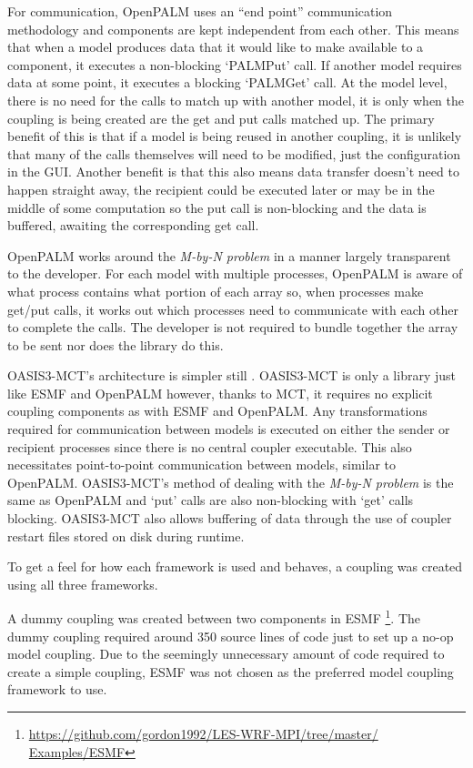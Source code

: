 \documentclass{acm_proc_article-sp}
\renewcommand{\_}{\underscore\hspace{0pt}}
\begin{document}
For communication, OpenPALM uses an ``end point'' communication methodology
\cite{CERFACS2007} and components are kept independent from each other. This
means that when a model produces data that it would like to make available to a
component, it executes a non-blocking `PALM\_Put' call. If another model
requires data at some point, it executes a blocking `PALM\_Get' call. At the
model level, there is no need for the calls to match up with another model, it
is only when the coupling is being created are the get and put calls matched up.
The primary benefit of this is that if a model is being reused in another
coupling, it is unlikely that many of the calls themselves will need to be
modified, just the configuration in the GUI. Another benefit is that this also
means data transfer doesn't need to happen straight away, the recipient could be
executed later or may be in the middle of some computation so the put call is
non-blocking and the data is buffered, awaiting the corresponding get call.

OpenPALM works around the \textit{M-by-N problem} in a manner largely
transparent to the developer. For each model with multiple processes, OpenPALM
is aware of what process contains what portion of each array so, when processes
make get/put calls, it works out which processes need to communicate with each
other to complete the calls. The developer is not required to bundle together
the array to be sent nor does the library do this.

OASIS3-MCT's architecture is simpler still \cite{OASIS3-MCT2013}. OASIS3-MCT is
only a library just like ESMF and OpenPALM however, thanks to MCT, it requires
no explicit coupling components as with ESMF and OpenPALM. Any transformations
required for communication between models is executed on either the sender or
recipient processes since there is no central coupler executable. This also
necessitates point-to-point communication between models, similar to OpenPALM.
OASIS3-MCT's method of dealing with the \textit{M-by-N problem} is the same as
OpenPALM and `put' calls are also non-blocking with `get' calls blocking.
OASIS3-MCT also allows buffering of data through the use of coupler restart
files stored on disk during runtime.

To get a feel for how each framework is used and behaves, a coupling was created
using all three frameworks.

A dummy coupling was created between two components in ESMF
\footnote{\url{https://github.com/gordon1992/LES-WRF-MPI/tree/master/
Examples/ESMF}}. The dummy coupling required around 350 source lines of code
just to set up a no-op model coupling. Due to the seemingly unnecessary amount
of code required to create a simple coupling, ESMF was not chosen as the
preferred model coupling framework to use.
\end{document}
